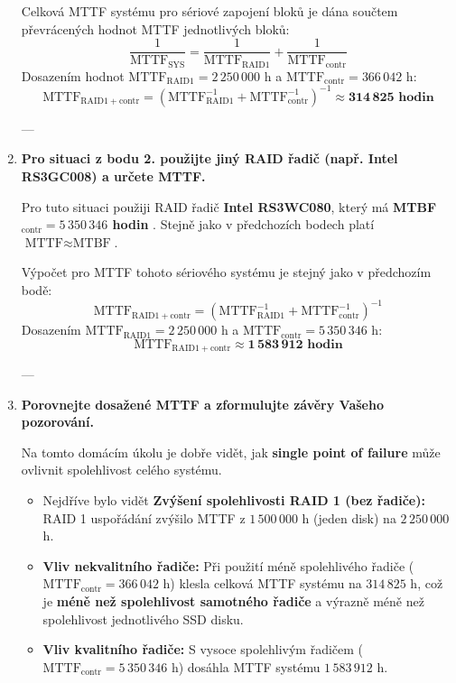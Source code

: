 \documentclass[10pt]{article} %
\begin{document}
\begin{enumerate}
		Celková MTTF systému pro sériové zapojení bloků je dána součtem převrácených hodnot MTTF jednotlivých bloků:
		$$
		\frac{1}{\text{MTTF}_{\text{SYS}}} = \frac{1}{\text{MTTF}_{\text{RAID}1}} + \frac{1}{\text{MTTF}_{\text{contr}}}
		$$
		Dosazením hodnot $\text{MTTF}_{\text{RAID}1} = 2\,250\,000$ h a $\text{MTTF}_{\text{contr}} = 366\,042$ h:
		$$
		\text{MTTF}_{\text{RAID}1+\text{contr}} = \left(\text{MTTF}_{\text{RAID}1}^{-1} + \text{MTTF}_{\text{contr}}^{-1}\right)^{-1} \approx \mathbf{314\,825 \text{ hodin}}
		$$
		
		---
		
		\item \textbf{Pro situaci z bodu 2. použijte jiný RAID řadič (např. Intel RS3GC008) a určete MTTF.}
		
		Pro tuto situaci použiji RAID řadič \textbf{Intel RS3WC080}, který má \textbf{MTBF$_{\text{contr}} = 5\,350\,346$ hodin} \cite{dalsiraidcontroler}. Stejně jako v předchozích bodech platí $\text{MTTF} \approx \text{MTBF}$.
		
		Výpočet pro MTTF tohoto sériového systému je stejný jako v předchozím bodě:
		$$
		\text{MTTF}_{\text{RAID}1+\text{contr}} = \left(\text{MTTF}_{\text{RAID}1}^{-1} + \text{MTTF}_{\text{contr}}^{-1}\right)^{-1}
		$$
		Dosazením $\text{MTTF}_{\text{RAID}1} = 2\,250\,000$ h a $\text{MTTF}_{\text{contr}} = 5\,350\,346$ h:
		$$
		\text{MTTF}_{\text{RAID}1+\text{contr}} \approx \mathbf{1\,583\,912 \text{ hodin}}
		$$
		
		---
		
		\item \textbf{Porovnejte dosažené MTTF a zformulujte závěry Vašeho pozorování.}
		
		Na tomto domácím úkolu je dobře vidět, jak \textbf{single point of failure} může ovlivnit spolehlivost celého systému.
		
		\begin{itemize}
			\item Nejdříve bylo vidět \textbf{Zvýšení spolehlivosti RAID 1 (bez řadiče):} RAID 1 uspořádání zvýšilo MTTF z $1\,500\,000$ h (jeden disk) na $2\,250\,000$ h.
			\item \textbf{Vliv nekvalitního řadiče:} Při použití méně spolehlivého řadiče ($\text{MTTF}_{\text{contr}} = 366\,042$ h) klesla celková MTTF systému na $314\,825$ h, což je \textbf{méně než spolehlivost samotného řadiče} a výrazně méně než spolehlivost jednotlivého SSD disku.
			\item \textbf{Vliv kvalitního řadiče:} S vysoce spolehlivým řadičem ($\text{MTTF}_{\text{contr}} = 5\,350\,346$ h) dosáhla MTTF systému $1\,583\,912$ h.
		\end{itemize}
		

\end{enumerate}
\end{document}
